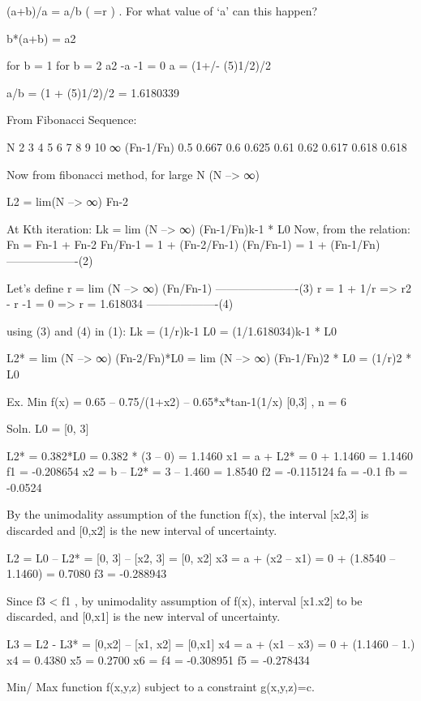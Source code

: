 (a+b)/a = a/b ( =r ) . For what value of  ‘a’ can this happen?

b*(a+b) = a2

for b = 1								for b = 2
a2 -a -1 = 0
a = (1+/- (5)1/2)/2

a/b = (1 + (5)1/2)/2 = 1.6180339



From Fibonacci Sequence:

N  	2	  	3  		4  		5  		6  		7  		8  		9 		10		∞
(Fn-1/Fn)        0.5  0.667    0.6    	0.625 	0.61 	0.62	0.617	0.618 			0.618


Now from fibonacci method, for large N (N --> ∞)

L2 = lim(N --> ∞) Fn-2

At Kth  iteration:
Lk = lim (N --> ∞) (Fn-1/Fn)k-1 * L0
Now, from the relation:
Fn = Fn-1 + Fn-2
Fn/Fn-1 = 1 + (Fn-2/Fn-1)
(Fn/Fn-1) = 1 + (Fn-1/Fn) -------------------(2)

Let’s define
r = lim (N --> ∞) (Fn/Fn-1)   ----------------------(3)
r = 1 + 1/r
=> r2 - r -1 = 0
=> r = 1.618034        -------------------(4)

using (3) and (4) in (1):
Lk = (1/r)k-1 L0
      = (1/1.618034)k-1 * L0

L2* = lim (N --> ∞) (Fn-2/Fn)*L0
        = lim (N --> ∞) (Fn-1/Fn)2 * L0
        = (1/r)2 * L0

Ex. Min f(x) = 0.65 – 0.75/(1+x2) – 0.65*x*tan-1(1/x)
[0,3] , n = 6

Soln. L0 = [0, 3]

L2* = 0.382*L0  = 0.382 * (3 – 0) = 1.1460
x1 = a + L2*  = 0 + 1.1460 = 1.1460			f1  = -0.208654
x2  = b – L2* = 	3 – 1.460	 = 1.8540			f2  = -0.115124
fa = -0.1
fb = -0.0524

By the unimodality assumption of the function f(x), the interval [x2,3] is discarded and [0,x2] is the new interval of uncertainty.

L2 = L0 – L2*  = [0, 3] – [x2, 3] = [0, x2]
x3  = a + (x2 – x1) = 0 + (1.8540 – 1.1460) = 0.7080
f3  = -0.288943

Since f3 < f1 , by unimodality assumption of f(x), interval [x1.x2] to be discarded, and [0,x1] is the new interval of uncertainty.

L3 = L2 - L3*  = [0,x2] – [x1, x2] = [0,x1]
x4 = a + (x1 – x3) = 0 + (1.1460 – 1.)
x4 = 0.4380                x5 = 0.2700			x6 = 
f4 = -0.308951			f5 = -0.278434


Min/ Max function f(x,y,z) subject to a constraint g(x,y,z)=c.

